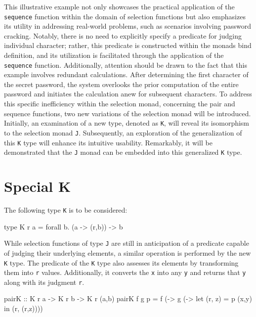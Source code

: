 \documentclass[runningheads]{llncs}
\begin{document}
This illustrative example not only showcases the practical application
of the \texttt{sequence} function within the domain of selection
functions but also emphasizes its utility in addressing real-world
problems, such as scenarios involving password cracking. Notably, there
is no need to explicitly specify a predicate for judging individual
character; rather, this predicate is constructed within the monads bind
definition, and its utilization is facilitated through the application
of the \texttt{sequence} function. Additionally, attention should be
drawn to the fact that this example involves redundant calculations.
After determining the first character of the secret password, the system
overlooks the prior computation of the entire password and initiates the
calculation anew for subsequent characters. To address this specific
inefficiency within the selection monad, concerning the pair and
sequence functions, two new variations of the selection monad will be
introduced. Initially, an examination of a new type, denoted as
\texttt{K}, will reveal its isomorphism to the selection monad
\texttt{J}. Subsequently, an exploration of the generalization of this
\texttt{K} type will enhance its intuitive usability. Remarkably, it
will be demonstrated that the \texttt{J} monad can be embedded into this
generalized \texttt{K} type.

\section{Special K}\label{special-k}

The following type \texttt{K} is to be considered:

\begin{code}
type K r a = forall b. (a -> (r,b)) -> b
\end{code}

While selection functions of type \texttt{J} are still in anticipation
of a predicate capable of judging their underlying elements, a similar
operation is performed by the new \texttt{K} type. The predicate of the
\texttt{K} type also assesses its elements by transforming them into
\texttt{r} values. Additionally, it converts the \texttt{x} into any
\texttt{y} and returns that \texttt{y} along with its judgment
\texttt{r}.

\begin{code}
pairK :: K r a -> K r b -> K r (a,b)
pairK f g p = f (\x -> 
              g (\y -> let (r, z) = p (x,y) 
                       in (r, (r,z))))
\end{code}
\end{document}
